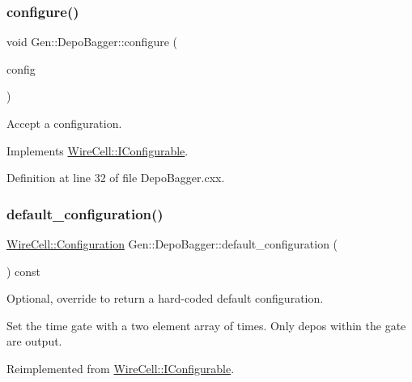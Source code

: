 \subsubsection{\texorpdfstring{configure()}{configure()}}
{\footnotesize\ttfamily void Gen\+::\+Depo\+Bagger\+::configure (\begin{DoxyParamCaption}\item[{const \hyperlink{namespace_wire_cell_a9f705541fc1d46c608b3d32c182333ee}{Wire\+Cell\+::\+Configuration} \&}]{config }\end{DoxyParamCaption})\hspace{0.3cm}{\ttfamily [virtual]}}



Accept a configuration. 



Implements \hyperlink{class_wire_cell_1_1_i_configurable_a57ff687923a724093df3de59c6ff237d}{Wire\+Cell\+::\+I\+Configurable}.



Definition at line 32 of file Depo\+Bagger.\+cxx.

\mbox{\label{class_wire_cell_1_1_gen_1_1_depo_bagger_ac00c7933215666449e5b364f2f8c5957}} 
\subsubsection{\texorpdfstring{default\+\_\+configuration()}{default\_configuration()}}
{\footnotesize\ttfamily \hyperlink{namespace_wire_cell_a9f705541fc1d46c608b3d32c182333ee}{Wire\+Cell\+::\+Configuration} Gen\+::\+Depo\+Bagger\+::default\+\_\+configuration (\begin{DoxyParamCaption}{ }\end{DoxyParamCaption}) const\hspace{0.3cm}{\ttfamily [virtual]}}



Optional, override to return a hard-\/coded default configuration. 

Set the time gate with a two element array of times. Only depos within the gate are output. 

Reimplemented from \hyperlink{class_wire_cell_1_1_i_configurable_a54841b2da3d1ea02189478bff96f7998}{Wire\+Cell\+::\+I\+Configurable}.



